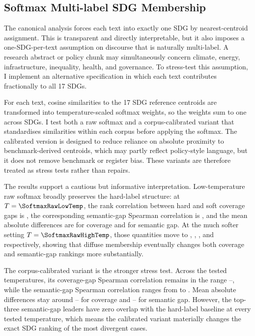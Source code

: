 \documentclass[12pt,a4paper]{article}
\begin{document}
\subsection{Softmax Multi-label SDG Membership}

The canonical analysis forces each text into exactly one SDG by nearest-centroid assignment. This is transparent and directly interpretable, but it also imposes a one-SDG-per-text assumption on discourse that is naturally multi-label. A research abstract or policy chunk may simultaneously concern climate, energy, infrastructure, inequality, health, and governance. To stress-test this assumption, I implement an alternative specification in which each text contributes fractionally to all 17 SDGs.

For each text, cosine similarities to the 17 SDG reference centroids are transformed into temperature-scaled softmax weights, so the weights sum to one across SDGs. I test both a raw softmax and a corpus-calibrated variant that standardises similarities within each corpus before applying the softmax. The calibrated version is designed to reduce reliance on absolute proximity to benchmark-derived centroids, which may partly reflect policy-style language, but it does not remove benchmark or register bias. These variants are therefore treated as stress tests rather than repairs.

The results support a cautious but informative interpretation. Low-temperature raw softmax broadly preserves the hard-label structure: at $T=\SoftmaxRawLowTemp$, the rank correlation between hard and soft coverage gaps is \SoftmaxRawLowCoverageSpearman{}, the corresponding semantic-gap Spearman correlation is \SoftmaxRawLowSemanticSpearman{}, and the mean absolute differences are \SoftmaxRawLowCoverageMad{} for coverage and \SoftmaxRawLowSemanticMad{} for semantic gap. At the much softer setting $T=\SoftmaxRawHighTemp$, those quantities move to \SoftmaxRawHighCoverageSpearman{}, \SoftmaxRawHighSemanticSpearman{}, \SoftmaxRawHighCoverageMad{}, and \SoftmaxRawHighSemanticMad{} respectively, showing that diffuse membership eventually changes both coverage and semantic-gap rankings more substantially.

The corpus-calibrated variant is the stronger stress test. Across the tested temperatures, its coverage-gap Spearman correlation remains in the range \SoftmaxCalCoverageSpearmanMin{}--\SoftmaxCalCoverageSpearmanMax{}, while the semantic-gap Spearman correlation ranges from \SoftmaxCalSemanticSpearmanMin{} to \SoftmaxCalSemanticSpearmanMax{}. Mean absolute differences stay around \SoftmaxCalCoverageMadMin{}--\SoftmaxCalCoverageMadMax{} for coverage and \SoftmaxCalSemanticMadMin{}--\SoftmaxCalSemanticMadMax{} for semantic gap. However, the top-three semantic-gap leaders have zero overlap with the hard-label baseline at every tested temperature, which means the calibrated variant materially changes the exact SDG ranking of the most divergent cases.
\end{document}
